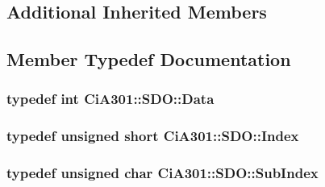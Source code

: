 \subsection*{Additional Inherited Members}


\subsection{Member Typedef Documentation}
\hypertarget{struct_ci_a301_1_1_s_d_o_a8224c82a3130510d9cdb8ae739de624b}{
\subsubsection[{Data}]{\setlength{\rightskip}{0pt plus 5cm}typedef int {\bf Ci\-A301\-::\-S\-D\-O\-::\-Data}}}\label{struct_ci_a301_1_1_s_d_o_a8224c82a3130510d9cdb8ae739de624b}
\hypertarget{struct_ci_a301_1_1_s_d_o_a23ec0bef652b1fad0123ec3bed770852}{
\subsubsection[{Index}]{\setlength{\rightskip}{0pt plus 5cm}typedef unsigned short {\bf Ci\-A301\-::\-S\-D\-O\-::\-Index}}}\label{struct_ci_a301_1_1_s_d_o_a23ec0bef652b1fad0123ec3bed770852}
\hypertarget{struct_ci_a301_1_1_s_d_o_add21496adb09c6f74c8f725c17ec116a}{
\subsubsection[{Sub\-Index}]{\setlength{\rightskip}{0pt plus 5cm}typedef unsigned char {\bf Ci\-A301\-::\-S\-D\-O\-::\-Sub\-Index}}}\label{struct_ci_a301_1_1_s_d_o_add21496adb09c6f74c8f725c17ec116a}


